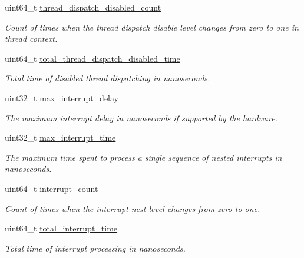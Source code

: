 \begin{DoxyCompactItemize}
uint64\+\_\+t \mbox{\hyperlink{structrtems__profiling__per__cpu_ad5ffd37b33203299ff1f2933931189b7}{thread\+\_\+dispatch\+\_\+disabled\+\_\+count}}
\begin{DoxyCompactList}\small\item\em Count of times when the thread dispatch disable level changes from zero to one in thread context. \end{DoxyCompactList}\item 
uint64\+\_\+t \mbox{\hyperlink{structrtems__profiling__per__cpu_a13aec425f945e9f0dd535f4db69a3de3}{total\+\_\+thread\+\_\+dispatch\+\_\+disabled\+\_\+time}}
\begin{DoxyCompactList}\small\item\em Total time of disabled thread dispatching in nanoseconds. \end{DoxyCompactList}\item 
uint32\+\_\+t \mbox{\hyperlink{structrtems__profiling__per__cpu_a8d43d26a8e780a2fa616c402396b351c}{max\+\_\+interrupt\+\_\+delay}}
\begin{DoxyCompactList}\small\item\em The maximum interrupt delay in nanoseconds if supported by the hardware. \end{DoxyCompactList}\item 
uint32\+\_\+t \mbox{\hyperlink{structrtems__profiling__per__cpu_a12f3c2b20ade7916dd9278c445805826}{max\+\_\+interrupt\+\_\+time}}
\begin{DoxyCompactList}\small\item\em The maximum time spent to process a single sequence of nested interrupts in nanoseconds. \end{DoxyCompactList}\item 
uint64\+\_\+t \mbox{\hyperlink{structrtems__profiling__per__cpu_afd48c947ae70c7739575621fb156f1e4}{interrupt\+\_\+count}}
\begin{DoxyCompactList}\small\item\em Count of times when the interrupt nest level changes from zero to one. \end{DoxyCompactList}\item 
uint64\+\_\+t \mbox{\hyperlink{structrtems__profiling__per__cpu_a98a594f04430a4fd78b14b509b3eb7ba}{total\+\_\+interrupt\+\_\+time}}
\begin{DoxyCompactList}\small\item\em Total time of interrupt processing in nanoseconds. \end{DoxyCompactList}\end{DoxyCompactItemize}


